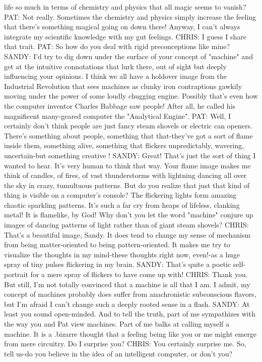    life so much in terms of chemistry and physics that all magic seems to vanish?
PAT: Not really. Sometimes the chemistry and physics simply increase the feeling
   that there's something magical going on down there! Anyway, I can't always
   integrate my scientific knowledge with my gut feelings. CHRIS: I guess I share
   that trait.
PAT: So how do you deal with rigid preconceptions like mine?
SANDY: I'd try to dig down under the surface of your concept of "machine" and get
   at the intuitive connotations that lurk there, out of sight but deeply influencing
   your opinions. I think we all have a holdover image from the Industrial
   Revolution that sees machines as clunky iron contraptions gawkily moving under
   the power of some loudly chugging engine. Possibly that's even how the
   computer inventor Charles Babbage saw people! After all, he called his
   magnificent many-geared computer the "Analytical Engine".
PAT: Well, I certainly don't think people are just fancy steam shovels or electric can
   openers. There's something about people, something that that-they've got a sort of
   flame inside them, something alive, something that flickers unpredictably,
   wavering, uncertain-but something creative !
SANDY: Great! That's just the sort of thing I wanted to hear. It's very human to think
   that way. Your flame image makes me think of candles, of fires, of vast
   thunderstorms with lightning dancing all over the sky in crazy, tumultuous
   patterns. But do you realize that just that kind of thing is visible on a computer's
   console? The flickering lights form amazing chaotic sparkling patterns. It's such
   a far cry from heaps of lifeless, clanking metal! It is flamelike, by God! Why
   don't you let the word "machine" conjure up images of dancing patterns of light
   rather than of giant steam shovels?
CHRIS: That's a beautiful image, Sandy. It does tend to change my sense of
   mechanism from being matter-oriented to being pattern-oriented. It makes me try
   to visualize the thoughts in my mind-these thoughts right now, even!-as a huge
   spray of tiny pulses flickering in my brain.
SANDY: That's quite a poetic self-portrait for a mere spray of flickers to have come
   up with!
CHRIS: Thank you. But still, I'm not totally convinced that a machine is all that I am.
   I admit, my concept of machines probably does suffer from anachronistic
   subconscious flavors, but I'm afraid I can't change such a deeply rooted sense in a
   flash.
SANDY: At least you sound open-minded. And to tell the truth, part of me
   sympathizes with the way you and Pat view machines. Part of me balks at calling
   myself a machine. It is a .bizarre thought that a feeling being like you or me
   might emerge from mere circuitry. Do I surprise you?
CHRIS: You certainly surprise me. So, tell us-do you believe in the idea of an
   intelligent computer, or don't you?




